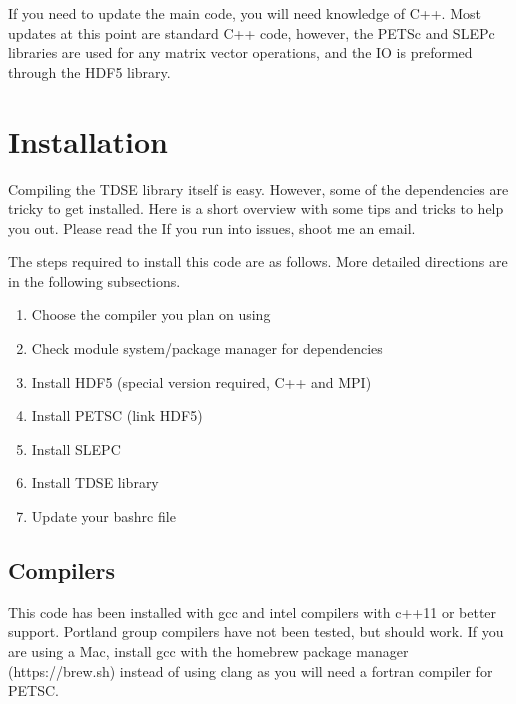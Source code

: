\documentclass{article}
\begin{document}
If you need to update the main code, you will need knowledge of C++. Most updates at this point are standard C++ code, however, the PETSc and SLEPc libraries are used for any matrix vector operations, and the IO is preformed through the HDF5 library.

\section{Installation} %
\label{sec:installation}
Compiling the TDSE library itself is easy. However, some of the dependencies are tricky to get installed. Here is a short overview with some tips and tricks to help you out. Please read the  If you run into issues, shoot me an email.

The steps required to install this code are as follows. More detailed directions are in the following subsections.
\begin{enumerate}
  \item Choose the compiler you plan on using
  \item Check module system/package manager for dependencies
  \item Install HDF5 (special version required, C++ and MPI)
  \item Install PETSC (link HDF5)
  \item Install SLEPC
  \item Install TDSE library
  \item Update your bashrc file
\end{enumerate}


\subsection{Compilers} %
\label{sub:compilers}
This code has been installed with gcc and intel compilers with c++11 or better support. Portland group compilers have not been tested, but should work. If you are using a Mac, install gcc with the homebrew package manager (https://brew.sh) instead of using clang as you will need a fortran compiler for PETSC.
\end{document}
